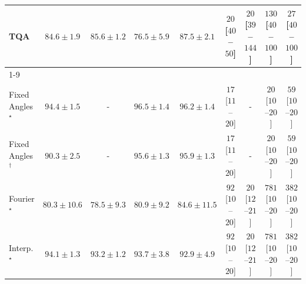 \begin{tabular}{l|cccc|cccc|}
TQA & {\cellcolor[HTML]{258745}} \color[HTML]{F1F1F1} $84.6\pm 1.9$ & {\cellcolor[HTML]{208242}} \color[HTML]{F1F1F1} $85.6\pm 1.2$ & {\cellcolor[HTML]{5DB96B}} \color[HTML]{F1F1F1} $76.5\pm 5.9$ & {\cellcolor[HTML]{14783E}} \color[HTML]{F1F1F1} $87.5\pm 2.1$ & {\cellcolor[HTML]{FFF4F0}} \color[HTML]{000000} $20$ [$40$--$50$] & {\cellcolor[HTML]{FFF4F0}} \color[HTML]{000000} $20$ [$39$--$144$] & {\cellcolor[HTML]{FDD9D6}} \color[HTML]{000000} $130$ [$40$--$100$] & {\cellcolor[HTML]{FFF3EF}} \color[HTML]{000000} $27$ [$40$--$100$] \\
\cline{1-9}
\multicolumn{9}{c}{\rule{0pt}{8pt}SV} \\
\midrule
Fixed Angles$^\star$ & {\cellcolor[HTML]{03446A}} \color[HTML]{F1F1F1} $94.4\pm 1.5$ & {\cellcolor[HTML]{000000}} \color[HTML]{F1F1F1} {\cellcolor{white}} \color{black} - & {\cellcolor[HTML]{023858}} \color[HTML]{F1F1F1} $96.5\pm 1.4$ & {\cellcolor[HTML]{02395A}} \color[HTML]{F1F1F1} $96.2\pm 1.4$ & {\cellcolor[HTML]{FFF5F1}} \color[HTML]{000000} $17$ [$11$--$20$] & {\cellcolor[HTML]{000000}} \color[HTML]{F1F1F1} {\cellcolor{white}} \color{black} - & {\cellcolor[HTML]{FFF4F0}} \color[HTML]{000000} $20$ [$10$--$20$] & {\cellcolor[HTML]{FEEBE7}} \color[HTML]{000000} $59$ [$10$--$20$] \\
Fixed Angles$^\dagger$ & {\cellcolor[HTML]{045B8F}} \color[HTML]{F1F1F1} $90.3\pm 2.5$ & {\cellcolor[HTML]{000000}} \color[HTML]{F1F1F1} {\cellcolor{white}} \color{black} - & {\cellcolor[HTML]{023D60}} \color[HTML]{F1F1F1} $95.6\pm 1.3$ & {\cellcolor[HTML]{023B5D}} \color[HTML]{F1F1F1} $95.9\pm 1.3$ & {\cellcolor[HTML]{FFF5F1}} \color[HTML]{000000} $17$ [$11$--$20$] & {\cellcolor[HTML]{000000}} \color[HTML]{F1F1F1} {\cellcolor{white}} \color{black} - & {\cellcolor[HTML]{FFF4F0}} \color[HTML]{000000} $20$ [$10$--$20$] & {\cellcolor[HTML]{FEEBE7}} \color[HTML]{000000} $59$ [$10$--$20$] \\
Fourier$^\star$ & {\cellcolor[HTML]{2D8ABD}} \color[HTML]{F1F1F1} $80.3\pm 10.6$ & {\cellcolor[HTML]{4094C3}} \color[HTML]{F1F1F1} $78.5\pm 9.3$ & {\cellcolor[HTML]{2987BC}} \color[HTML]{F1F1F1} $80.9\pm 9.2$ & {\cellcolor[HTML]{0872B1}} \color[HTML]{F1F1F1} $84.6\pm 11.5$ & {\cellcolor[HTML]{FDE3E0}} \color[HTML]{000000} $92$ [$10$--$20$] & {\cellcolor[HTML]{FFF4F0}} \color[HTML]{000000} $20$ [$12$--$21$] & {\cellcolor[HTML]{49006A}} \color[HTML]{F1F1F1} $781$ [$10$--$20$] & {\cellcolor[HTML]{F76EA3}} \color[HTML]{F1F1F1} $382$ [$10$--$20$] \\
Interp.$^\star$ & {\cellcolor[HTML]{03466E}} \color[HTML]{F1F1F1} $94.1\pm 1.3$ & {\cellcolor[HTML]{034B76}} \color[HTML]{F1F1F1} $93.2\pm 1.2$ & {\cellcolor[HTML]{034871}} \color[HTML]{F1F1F1} $93.7\pm 3.8$ & {\cellcolor[HTML]{034D79}} \color[HTML]{F1F1F1} $92.9\pm 4.9$ & {\cellcolor[HTML]{FDE3E0}} \color[HTML]{000000} $92$ [$10$--$20$] & {\cellcolor[HTML]{FFF4F0}} \color[HTML]{000000} $20$ [$12$--$21$] & {\cellcolor[HTML]{49006A}} \color[HTML]{F1F1F1} $781$ [$10$--$20$] & {\cellcolor[HTML]{F76EA3}} \color[HTML]{F1F1F1} $382$ [$10$--$20$] \\

\end{tabular}
